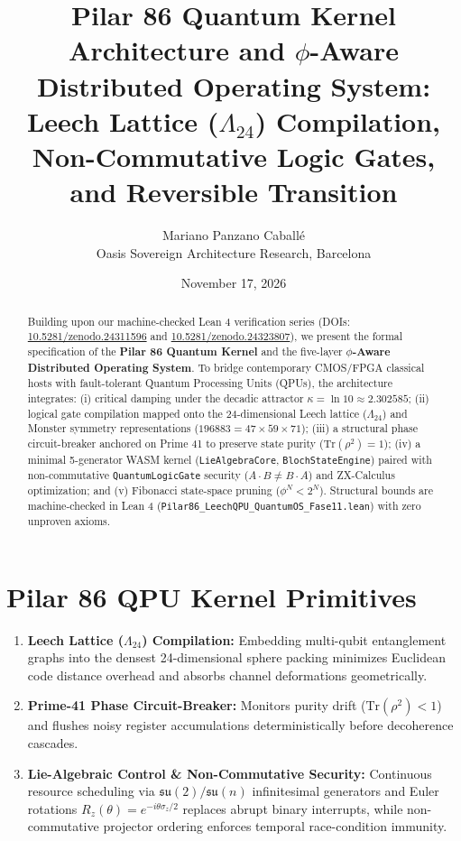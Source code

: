 \documentclass[11pt,a4paper]{article}
\title{\textbf{Pilar 86 Quantum Kernel Architecture and $\phi$-Aware Distributed Operating System: Leech Lattice ($\Lambda_{24}$) Compilation, Non-Commutative Logic Gates, and Reversible Transition}}
\author{Mariano Panzano Caball\'e \\ \small Oasis Sovereign Architecture Research, Barcelona}
\date{November 17, 2026}
\begin{document}
\maketitle

\begin{abstract}
Building upon our machine-checked Lean 4 verification series (DOIs: \href{https://doi.org/10.5281/zenodo.24311596}{10.5281/zenodo.24311596} and \href{https://doi.org/10.5281/zenodo.24323807}{10.5281/zenodo.24323807}), we present the formal specification of the \textbf{Pilar 86 Quantum Kernel} and the five-layer \textbf{$\phi$-Aware Distributed Operating System}. To bridge contemporary CMOS/FPGA classical hosts with fault-tolerant Quantum Processing Units (QPUs), the architecture integrates: (i) critical damping under the decadic attractor $\kappa = \ln 10 \approx 2.302585$; (ii) logical gate compilation mapped onto the 24-dimensional Leech lattice ($\Lambda_{24}$) and Monster symmetry representations ($196883 = 47 \times 59 \times 71$); (iii) a structural phase circuit-breaker anchored on Prime 41 to preserve state purity ($\mathrm{Tr}(\rho^2) = 1$); (iv) a minimal 5-generator WASM kernel (\texttt{LieAlgebraCore}, \texttt{BlochStateEngine}) paired with non-commutative \texttt{QuantumLogicGate} security ($A \cdot B \neq B \cdot A$) and ZX-Calculus optimization; and (v) Fibonacci state-space pruning ($\phi^N < 2^N$). Structural bounds are machine-checked in Lean 4 (\texttt{Pilar86\_LeechQPU\_QuantumOS\_Fase11.lean}) with zero unproven axioms.
\end{abstract}

\section{Pilar 86 QPU Kernel Primitives}
\begin{enumerate}
    \item \textbf{Leech Lattice ($\Lambda_{24}$) Compilation:} Embedding multi-qubit entanglement graphs into the densest 24-dimensional sphere packing minimizes Euclidean code distance overhead and absorbs channel deformations geometrically.
    \item \textbf{Prime-41 Phase Circuit-Breaker:} Monitors purity drift ($\mathrm{Tr}(\rho^2) < 1$) and flushes noisy register accumulations deterministically before decoherence cascades.
    \item \textbf{Lie-Algebraic Control \& Non-Commutative Security:} Continuous resource scheduling via $\mathfrak{su}(2)/\mathfrak{su}(n)$ infinitesimal generators and Euler rotations $R_z(\theta) = e^{-i\theta\sigma_z/2}$ replaces abrupt binary interrupts, while non-commutative projector ordering enforces temporal race-condition immunity.
\end{enumerate}
\end{document}
